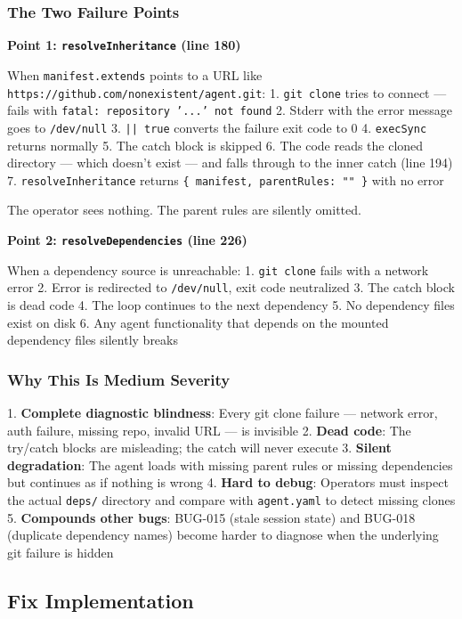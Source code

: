 \subsubsection*{The Two Failure Points}

\textbf{Point 1: \texttt{resolveInheritance} (line 180)}

When \texttt{manifest.extends} points to a URL like \texttt{https://github.com/nonexistent/agent.git}:
1. \texttt{git clone} tries to connect — fails with \texttt{fatal: repository '...' not found}
2. Stderr with the error message goes to \texttt{/dev/null}
3. \texttt{|| true} converts the failure exit code to 0
4. \texttt{execSync} returns normally
5. The catch block is skipped
6. The code reads the cloned directory — which doesn't exist — and falls through to the inner catch (line 194)
7. \texttt{resolveInheritance} returns \texttt{\{ manifest, parentRules: "" \}} with no error

The operator sees nothing. The parent rules are silently omitted.

\textbf{Point 2: \texttt{resolveDependencies} (line 226)}

When a dependency source is unreachable:
1. \texttt{git clone} fails with a network error
2. Error is redirected to \texttt{/dev/null}, exit code neutralized
3. The catch block is dead code
4. The loop continues to the next dependency
5. No dependency files exist on disk
6. Any agent functionality that depends on the mounted dependency files silently breaks

\subsubsection*{Why This Is Medium Severity}

1. \textbf{Complete diagnostic blindness}: Every git clone failure — network error, auth failure, missing repo, invalid URL — is invisible
2. \textbf{Dead code}: The try/catch blocks are misleading; the catch will never execute
3. \textbf{Silent degradation}: The agent loads with missing parent rules or missing dependencies but continues as if nothing is wrong
4. \textbf{Hard to debug}: Operators must inspect the actual \texttt{deps/} directory and compare with \texttt{agent.yaml} to detect missing clones
5. \textbf{Compounds other bugs}: BUG-015 (stale session state) and BUG-018 (duplicate dependency names) become harder to diagnose when the underlying git failure is hidden


\subsection*{Fix Implementation}
